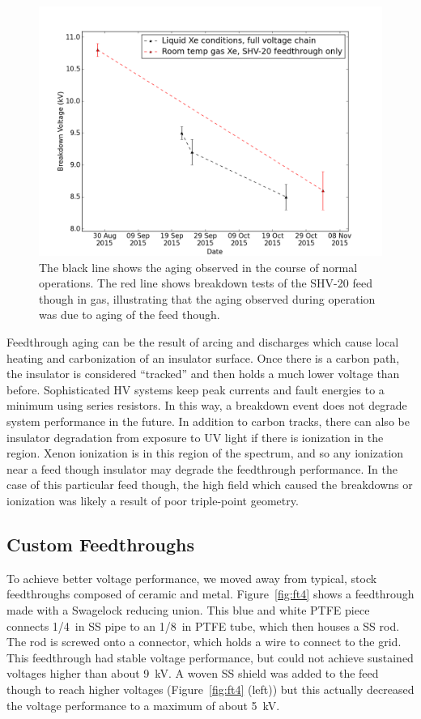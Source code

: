 \begin{figure}[htbp]
\begin{center}
\includegraphics[width=5in]{figures/testbed/shv20_breakdowns.png}
\caption{The black line shows the aging observed in the course of normal operations. The red line shows breakdown tests of the SHV-20 feed though in gas, illustrating that the aging observed during operation was due to aging of the feed though.}
\label{fig:aging}
\end{center}
\end{figure}

Feedthrough aging can be the result of arcing and discharges which cause local heating and carbonization of an insulator surface. Once there is a carbon path, the insulator is considered ``tracked'' and then holds a much lower voltage than before. Sophisticated \ac{HV} systems keep peak currents and fault energies to a minimum using series resistors. In this way, a breakdown event does not degrade system performance in the future. In addition to carbon tracks, there can also be insulator degradation from exposure to \ac{UV} light if there is ionization in the region. Xenon ionization is in this region of the spectrum, and so any ionization near a feed though insulator may degrade the feedthrough performance. In the case of this particular feed though, the high field which caused the breakdowns or ionization was likely a result of poor triple-point geometry. 

\FloatBarrier
\subsection{Custom Feedthroughs}
To achieve better voltage performance, we moved away from typical, stock feedthroughs composed of ceramic and metal. Figure~\ref{fig:ft4} shows a feedthrough made with a Swagelock reducing union. This blue and white \ac{PTFE} piece connects 1/4~in \ac{SS} pipe to an 1/8~in \ac{PTFE} tube, which then houses a \ac{SS} rod. The rod is screwed onto a connector, which holds a wire to connect to the grid. This feedthrough had stable voltage performance, but could not achieve sustained voltages higher than about 9~kV. A woven \ac{SS} shield was added to the feed though to reach higher voltages (Figure~\ref{fig:ft4} (left)) but this actually decreased the voltage performance to a maximum of about 5~kV.   

